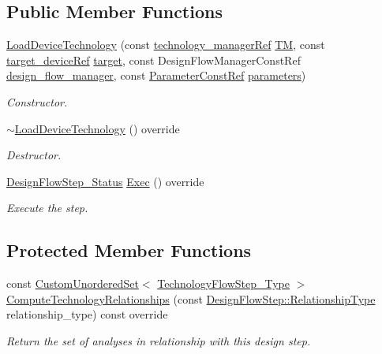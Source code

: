 \subsection*{Public Member Functions}
\begin{DoxyCompactItemize}
\item 
\hyperlink{classLoadDeviceTechnology_aa2de30a709666b525e0e75039874c30f}{Load\+Device\+Technology} (const \hyperlink{technology__manager_8hpp_a4b9ecd440c804109c962654f9227244e}{technology\+\_\+manager\+Ref} \hyperlink{classTechnologyFlowStep_a4aeea30129ed65348c3bad932b3a135b}{TM}, const \hyperlink{target__device_8hpp_acedb2b7a617e27e6354a8049fee44eda}{target\+\_\+device\+Ref} \hyperlink{classTechnologyFlowStep_a1a16880c55bddc3f9dbc495636d7a8cb}{target}, const Design\+Flow\+Manager\+Const\+Ref \hyperlink{classDesignFlowStep_ab770677ddf087613add30024e16a5554}{design\+\_\+flow\+\_\+manager}, const \hyperlink{Parameter_8hpp_a37841774a6fcb479b597fdf8955eb4ea}{Parameter\+Const\+Ref} \hyperlink{classDesignFlowStep_a802eaafe8013df706370679d1a436949}{parameters})
\begin{DoxyCompactList}\small\item\em Constructor. \end{DoxyCompactList}\item 
\hyperlink{classLoadDeviceTechnology_a982c1203a8d4be1f1e850d1efda27793}{$\sim$\+Load\+Device\+Technology} () override
\begin{DoxyCompactList}\small\item\em Destructor. \end{DoxyCompactList}\item 
\hyperlink{design__flow__step_8hpp_afb1f0d73069c26076b8d31dbc8ebecdf}{Design\+Flow\+Step\+\_\+\+Status} \hyperlink{classLoadDeviceTechnology_a694eac1b69f97358027d74d939d3574f}{Exec} () override
\begin{DoxyCompactList}\small\item\em Execute the step. \end{DoxyCompactList}\end{DoxyCompactItemize}
\subsection*{Protected Member Functions}
\begin{DoxyCompactItemize}
\item 
const \hyperlink{classCustomUnorderedSet}{Custom\+Unordered\+Set}$<$ \hyperlink{technology__flow__step_8hpp_a65208cfec963a7d7def292f9db428292}{Technology\+Flow\+Step\+\_\+\+Type} $>$ \hyperlink{classLoadDeviceTechnology_a5db6b3f94fc4252f2104c37c0ac21ce7}{Compute\+Technology\+Relationships} (const \hyperlink{classDesignFlowStep_a723a3baf19ff2ceb77bc13e099d0b1b7}{Design\+Flow\+Step\+::\+Relationship\+Type} relationship\+\_\+type) const override
\begin{DoxyCompactList}\small\item\em Return the set of analyses in relationship with this design step. \end{DoxyCompactList}\end{DoxyCompactItemize}
